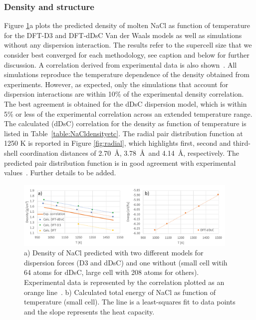 \documentclass[preprint,3p,10pt,onecolumn,number,sort&compress]{elsarticle}
\begin{document}
\subsubsection{Density and structure}
Figure \ref{fig:NaCldensity}a plots the predicted density of molten NaCl as function of temperature for the DFT-D3 and DFT-dDsC Van der Waals models as well as simulations without any dispersion interaction. The results refer to the supercell size that we consider best converged for each methodology, see caption and below for further discussion. A correlation derived from experimental data is also shown~\cite{Janz1988}. All simulations reproduce the temperature dependence of the density obtained from experiments. However, as expected, only the simulations that account for dispersion interactions are within 10\% of the experimental density correlation. The best agreement is obtained for the dDsC dispersion model, which is within 5\% or less of the experimental correlation across an extended temperature range. The calculated (dDsC) correlation for the density as function of temperature is listed in Table~\ref{table:NaCldensityetc}. 
The radial pair distribution function at 1250 K is reported in Figure \ref{fig:radial}, which highlights first, second and third-shell coordination distances of 2.70~\AA, 3.78~\AA~and 4.14~\AA, respectively. The predicted pair distribution function is in good agreement with experimental values~\cite{Edwards_1975}. {\color{red}Further details to be added.}

\begin{figure}[htb]
\centering
\includegraphics[width=0.95\textwidth]{FIG2.pdf}
\caption{a) Density of NaCl predicted with two different models for dispersion forces (D3 and dDsC) and one without (small cell witih 64 atoms for dDsC, large cell with 208 atoms for others). Experimental data is represented by the correlation plotted as an orange line~\cite{Janz1988}. b) Calculated total energy of NaCl as function of temperature (small cell). The line is a least-squares fit to data points and the slope represents the heat capacity.} %
\label{fig:NaCldensity}
\end{figure}
\end{document}
